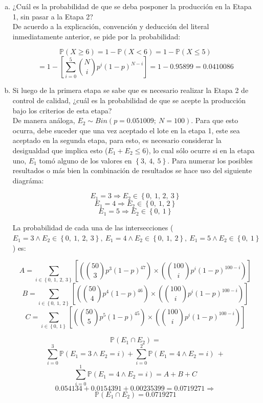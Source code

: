 \documentclass[11pt, spanish]{article}
\begin{document}
\begin{enumerate}[(a)]
\item ¿Cuál es la probabilidad de que se deba posponer la producción en la Etapa 1, sin
pasar a la Etapa 2?\\

De acuerdo a la explicación, convención y deducción del literal inmediatamente anterior, se pide por la probabilidad:

$$\mathbb{P}(X \geq 6) = 1 - \mathbb{P}(X < 6) = 1 - \mathbb{P}(X \leq 5)$$
$$= 1 - \left[ \sum_{i = 0}^{5}  \binom{N}{i}p^i(1-p)^{N-i} \right] = 1 - 0.95899 = 0.0410086$$

\item Si luego de la primera etapa se sabe que es necesario realizar la Etapa 2 de
control de calidad, ¿cuál es la probabilidad de que se acepte la producción bajo los criterios de
esta etapa?\\

De manera análoga, $E_2 \sim Bin(p = 0.051009;\ N = 100)$. Para que esto ocurra, debe suceder que una vez aceptado el lote en la etapa 1, este sea aceptado en la segunda etapa, para esto, es necesario considerar la desigualdad que implica esto ($E_1 + E_2 \leq 6$), lo cual sólo ocurre si en la etapa uno, $E_1$ tomó alguno de los valores en $\left\{ 3,\ 4,\ 5 \right\}$. Para numerar los posibles resultados o más bien la combinación de resultados se hace uso del siguiente diagráma:

$$E_1 = 3 \Rightarrow E_2 \in \left\{ 0,\ 1,\, 2,\ 3\right\}$$
$$E_1 = 4 \Rightarrow E_2 \in \left\{ 0,\ 1,\, 2\right\}$$
$$E_1 = 5 \Rightarrow E_2 \in \left\{ 0,\ 1\right\}$$

La probabilidad de cada una de las intersecciones ($E_1 = 3 \wedge E_2 \in \left\{ 0,\ 1,\ 2,\ 3 \right\},\ E_1 = 4 \wedge E_2 \in \left\{ 0,\ 1,\ 2\right\},\ E_1 = 5 \wedge E_2 \in \left\{ 0,\ 1\right\}$) es:

$$A = \sum_{i \in \left\{ 0,\ 1,\ 2,\ 3 \right\}} \left[ \left( \binom{50}{3}p^3(1-p)^{47} \right) \times  \left( \binom{100}{i}p^i(1-p)^{100 - i} \right) \right]$$
$$B = \sum_{i \in \left\{ 0,\ 1,\ 2 \right\}} \left[ \left( \binom{50}{4}p^4(1-p)^{46} \right) \times  \left( \binom{100}{i}p^i(1-p)^{100 - i} \right) \right]$$
$$C = \sum_{i \in \left\{ 0,\ 1 \right\}} \left[ \left( \binom{50}{5}p^5(1-p)^{45} \right) \times  \left( \binom{100}{i}p^i(1-p)^{100 - i} \right) \right]$$

$$\mathbb{P}(E_1 \cap E_2) = $$
$$ \sum_{i = 0}^{3} \mathbb{P}(E_1 = 3 \wedge E_2 = i) +  \sum_{i = 0}^{2} \mathbb{P}(E_1 = 4 \wedge E_2 = i)\ + $$
$$ \sum_{i = 0}^{1} \mathbb{P}(E_1 = 4 \wedge E_2 = i) = A + B + C$$
$$0.054134 + 0.0154391 + 0.00235399 = 0.0719271 \Rightarrow$$
$$\mathbb{P}(E_1 \cap E_2) = 0.0719271$$


\end{enumerate}
\end{document}
